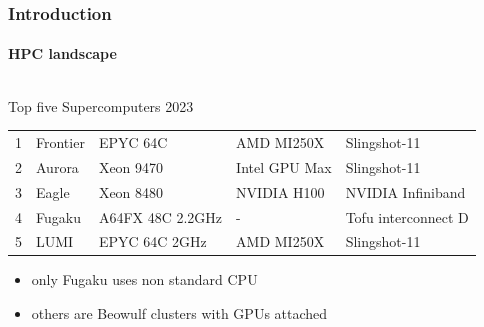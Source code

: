 \documentclass[aspectratio=169]{beamer}
\begin{document}
\begin{frame}[fragile]
\frametitle{Introduction}
\framesubtitle{HPC landscape}
\begin{columns}
\begin{block}{Top five Supercomputers 2023}
\begin{table}
\small
\begin{tabular}{c|l|l|l|l}
1 &	Frontier& EPYC 64C &AMD MI250X &Slingshot-11 \\
2 &	Aurora  & Xeon 9470 & Intel GPU Max&Slingshot-11 \\
3 &	Eagle & Xeon 8480 &  NVIDIA H100 & NVIDIA Infiniband \\
\rowcolor{backcolour}
4 &	Fugaku &  A64FX 48C 2.2GHz & - & Tofu interconnect D \\
5 &	LUMI &  EPYC 64C 2GHz & AMD MI250X & Slingshot-11 
\end{tabular}
\end{table}
\begin{itemize}
  \item only Fugaku uses non standard CPU
  \item others are Beowulf clusters with GPUs attached
\end{itemize}
\end{block}
\column{2cm}
\end{columns}
\end{frame}
\end{document}
